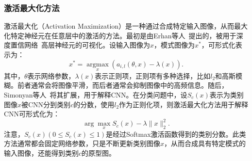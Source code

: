\subsubsection{激活最大化方法}
激活最大化（Activation Maximization）是一种通过合成特定输入图像，从而最大化特定神经元在任意层中的激活的方法。最初是由Erhan等人~\cite{erhan2009visualizing}提出的，被用于深度置信网络~\cite{hinton2006fast}高层神经元的可视化。设输入图像为$x$，模式图像为$x^*$，可形式化表示为：
\begin{equation*}
x^{*}=\underset{x}{\operatorname{argmax}}\left(a_{i, l}(\theta, x)-\lambda(x)\right).
\end{equation*}
其中，$\theta$表示网络参数，$\lambda(x)$表示正则项，正则项有多种选择，比如$l_2$和高斯模糊。前者通常会将图像平滑，而后者通常会抑制图像中的高频信息。随后，Simonyan等人~\cite{simonyan2013deep}将其扩展，用于解释CNN。在分类问题中，设$S_{c}(x)$表示为类别图像$x$被CNN分到类别$c$的分数，使用$l_2$作为正则化项，则激活最大化方法用于解释CNN可形式化为：
\begin{equation*}
\arg \max _{x} S_{c}(x)-\lambda\|x\|_{2}^{2}.
\end{equation*}
注意，$S_{c}(x)(0\leq S_{c}(x) \leq 1)$是经过Softmax激活函数得到的类别分数。此类方法通常都会固定网络参数，只是不断更新类别图像$x$，从而合成具有特定模式的输入图像，还能得到类别$c$的原型图。


